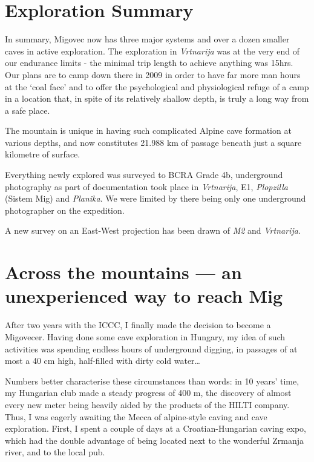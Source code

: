 \hypertarget{exploration-summary}{%
\section{Exploration Summary}\label{exploration-summary}}

In summary, Migovec now has three major systems and over a dozen smaller
caves in active exploration. The exploration in \emph{Vrtnarija} was at
the very end of our endurance limits - the minimal trip length to
achieve anything was 15hrs. Our plans are to camp down there in 2009 in
order to have far more man hours at the `coal face' and to offer the
psychological and physiological refuge of a camp in a location that, in
spite of its relatively shallow depth, is truly a long way from a safe
place.

The mountain is unique in having such complicated Alpine cave formation
at various depths, and now constitutes 21.988 km of passage beneath just
a square kilometre of surface.

Everything newly explored was surveyed to BCRA Grade 4b, underground
photography as part of documentation took place in \emph{Vrtnarija}, E1,
\emph{Plopzilla} (Sistem Mig) and \emph{Planika}. We were limited by
there being only one underground photographer on the expedition.

A new survey on an East-West projection has been drawn of \emph{M2} and
\emph{Vrtnarija}.


\hypertarget{across-the-mountains-an-unexperienced-way-to-reach-mig}{%
\section{Across the mountains --- an unexperienced way to reach
Mig}\label{across-the-mountains-an-unexperienced-way-to-reach-mig}}

After two years with the ICCC, I finally made the decision to become a
Migovecer. Having done some cave exploration in Hungary, my idea of such
activities was spending endless hours of underground digging, in
passages of at most a 40 cm high, half-filled with dirty cold
water\ldots{}

Numbers better characterise these circumstances than words: in 10 years'
time, my Hungarian club made a steady progress of 400 m, the discovery
of almost every new meter being heavily aided by the products of the
HILTI company. Thus, I was eagerly awaiting the Mecca of alpine-style
caving and cave exploration. First, I spent a couple of days at a
Croatian-Hungarian caving expo, which had the double advantage of being
located next to the wonderful Zrmanja river, and to the local pub.

